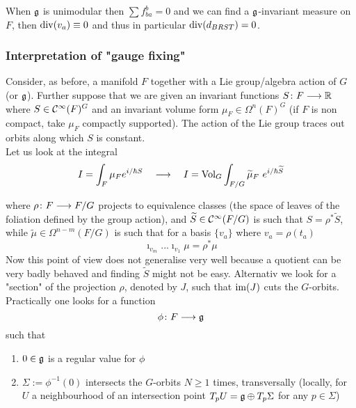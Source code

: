 When $\mathfrak{g}$ is unimodular then $\sum f^b_{ba} = 0$ and we can find a $\mathfrak{g}$-invariant measure on $F$, then $\operatorname{div}(v_a) \equiv 0$ and thus in particular $\operatorname{div}(d_{BRST}) = 0$.

\subsubsection{Interpretation of "gauge fixing"}
Consider, as before, a manifold $F$ together with a Lie group/algebra action of $G$ (or $\mathfrak{g}$). Further suppose that we are given an invariant functions $S \colon F \longrightarrow \mathbb{R}$ where $S \in \mathcal{C}^{\infty}(F)^G$ and an invariant volume form $\mu_F \in \Omega^n(F)^G$ (if $F$ is non compact, take $\mu_F$ compactly supported). The action of the Lie group traces out orbits along which $S$ is constant.\\

Let us look at the integral
\begin{equation}
  I = \int_{F} \mu_F e^{i/\hbar S} \quad \longrightarrow \quad  I = \operatorname{Vol}_G \int_{F / G} \widetilde{\mu}_F \ e^{i/\hbar \widetilde{S}}
\end{equation}

where $\rho \colon F \longrightarrow F/G$ projects to equivalence classes (the space of leaves of the foliation defined by the group action), and $\widetilde{S} \in \mathcal{C}^{\infty}(F/G)$ is such that $S = \rho^* \widetilde{S}$, while $\widetilde{\mu} \in \Omega^{n-m}(F/G)$ is such that for a basis $\{v_a\}$ where $v_a = \rho(t_a)$
\begin{equation}
  \imath_{v_m} ... \imath_{v_1} \mu = \rho^* \mu
\end{equation}
Now this point of view does not generalise very well because a quotient can be very badly behaved and finding $\widetilde{S}$ might not be easy. Alternativ we look for a "section" of the projection $\rho$, denoted by $J$, such that $\operatorname{im}(J)$ cuts the $G$-orbits. Practically one looks for a function
\begin{equation}
  \phi \colon F \lra \gf
\end{equation}
such that
\begin{enumerate}
  \item $0 \in \mathfrak{g}$ is a regular value for $\phi$
  \item $\Sigma := \phi^{-1}(0)$ intersects the $G$-orbits $N \geq 1$ times, transversally (locally, for $U$ a neighbourhood of an intersection point $T_p U = \mathfrak{g} \oplus T_p \Sigma$ for any $p \in \Sigma$)
\end{enumerate}

